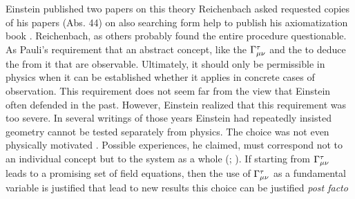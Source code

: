 \documentclass[draft]{article}
\begin{document}

Einstein published two papers on this theory \citep{Einstein1923c,Einstein1923e} Reichenbach asked requested copies of his papers (Abs. 44) on  also searching form help to publish his axiomatization book \citep{Reichenbach1924}. Reichenbach, as others probably found the entire procedure questionable. As Pauli's requirement that an abstract concept, like the $\Gamma^\tau_{\mu\nu}$ and the to deduce the \Fmn from it that are observable. Ultimately, it should only be permissible in physics when it can be established whether it applies in concrete cases of observation. This requirement does not seem far from the view that Einstein often defended in the past. However, Einstein realized that this requirement was too severe. In several writings of those years Einstein had repeatedly insisted geometry cannot be tested separately from physics. The choice was not even physically motivated \citep{Einstein1923}. Possible experiences, he claimed, must correspond not to an individual concept but to the system as a whole (\cite[1692]{Einstein1924}; \cf\cite{Giovanelli2014a}). If starting from $\Gamma^\tau_{\mu\nu}$ leads to a promising set of field equations, then the use of $\Gamma^\tau_{\mu\nu}$ as a fundamental variable is justified that lead to new results this choice can be justified \emph{post facto}
\end{document}
